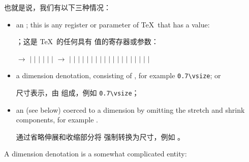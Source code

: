 也就是说，我们有以下三种情况：
\begin{itemize} \item an ; this is
 any register or parameter of \TeX\ that has a  value:

 ；这是 \TeX\ 的任何具有  值的寄存器或参数：
 \begin{disp}\PopIndentLevel{} $\longrightarrow$
      \nl
      \indent $|$  $|$ \nl
      \indent $|$  $|$ \nl
      \indent $|$ \nl
      \indent $|$ \nl
       $\longrightarrow$ \nl
      \indent $|$  $|$ \nl
      \indent $|$  $|$ \nl
      \indent $|$  $|$  $|$ \nl
      \indent $|$  $|$ \nl
      \indent $|$  $|$ \nl
      \indent $|$  $|$ \nl
      \indent $|$  $|$ \nl
      \indent $|$  $|$ \nl
      \indent $|$  $|$ 
 \end{disp}
\item  a dimension denotation, 
 consisting of ,
 for example \verb>0.7\vsize>; or

 尺寸表示，由  组成，例如 \verb>0.7\vsize>；
\item an  (see below) 
 coerced to a dimension by omitting
 the stretch and shrink components, for example .

 通过省略伸展和收缩部分将  强制转换为尺寸，例如 。
\end{itemize}

A dimension denotation is a somewhat complicated entity:

